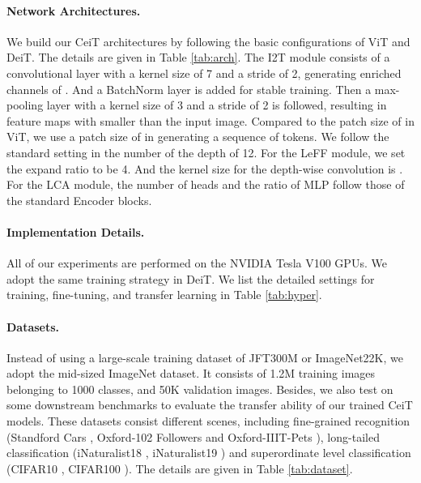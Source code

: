 \documentclass[10pt,twocolumn,letterpaper]{article}
\begin{document}
\paragraph{Network Architectures.} We build our CeiT architectures by following the basic configurations of ViT and DeiT. The details are given in Table \ref{tab:arch}. The I2T module consists of a convolutional layer with a kernel size of 7 and a stride of 2, generating enriched channels of . And a BatchNorm layer is added for stable training. Then a max-pooling layer with a kernel size of 3 and a stride of 2 is followed, resulting in feature maps with  smaller than the input image. Compared to the patch size of  in ViT, we use a patch size of  in generating a sequence of tokens. We follow the standard setting in the number of the depth of 12. For the LeFF module, we set the expand ratio  to be 4. And the kernel size for the depth-wise convolution is . For the LCA module, the number of heads and the ratio of MLP follow those of the standard Encoder blocks.

\paragraph{Implementation Details.} All of our experiments are performed on the NVIDIA Tesla V100 GPUs. We adopt the same training strategy in DeiT. We list the detailed settings for training, fine-tuning, and transfer learning in Table \ref{tab:hyper}.

\paragraph{Datasets.} Instead of using a large-scale training dataset of JFT300M or ImageNet22K, we adopt the mid-sized ImageNet \cite{DBLP:journals/ijcv/RussakovskyDSKS15} dataset. It consists of 1.2M training images belonging to 1000 classes, and 50K validation images. Besides, we also test on some downstream benchmarks to evaluate the transfer ability of our trained CeiT models. These datasets consist different scenes, including fine-grained recognition (Standford Cars \cite{DBLP:conf/iccvw/Krause0DF13}, Oxford-102 Followers \cite{DBLP:conf/icvgip/NilsbackZ08} and Oxford-IIIT-Pets \cite{DBLP:conf/cvpr/ParkhiVZJ12}), long-tailed classification (iNaturalist18 \cite{DBLP:journals/corr/HornASSAPB17}, iNaturalist19 \cite{DBLP:journals/corr/HornASSAPB17}) and superordinate level classification (CIFAR10 \cite{Krizhevsky09learningmultiple}, CIFAR100 \cite{Krizhevsky09learningmultiple}). The details are given in Table \ref{tab:dataset}.
\end{document}
